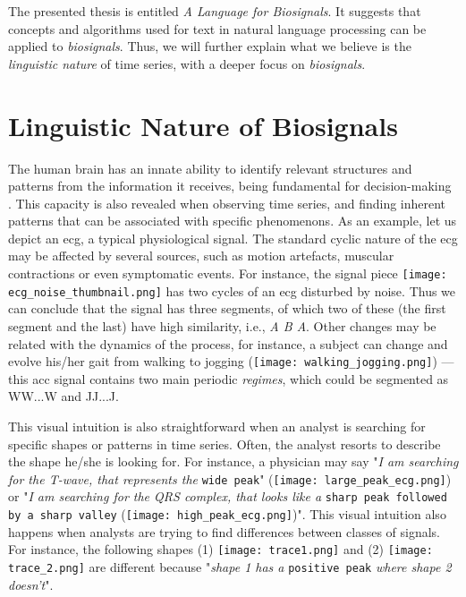 The presented thesis is entitled \textit{A Language for Biosignals}. It suggests that concepts and algorithms used for text in natural language processing can be applied to \textit{biosignals}. Thus, we will further explain what we believe is the \textit{linguistic nature} of time series, with a deeper focus on \textit{biosignals}.  

\section{Linguistic Nature of Biosignals} 
\label{sub:context1}

The human brain has an innate ability to identify relevant structures and patterns from the information it receives, being fundamental for decision-making \cite{cognition}. This capacity is also revealed when observing time series, and finding inherent patterns that can be associated with specific phenomenons. 
As an example, let us depict an \gls{ecg}, a typical physiological signal. The standard cyclic nature of the \gls{ecg} may be affected by several sources, such as motion artefacts, muscular contractions or even symptomatic events.
For instance, the signal piece \texttt{[image: ecg\_noise\_thumbnail.png]} has two cycles of an \textcolor{myblue}{\gls{ecg}} disturbed by \textcolor{myred}{noise}. Thus we can conclude that the signal has three segments, of which two of these (the first segment and the last) have high similarity, i.e., \textit{\textcolor{myblue}{A} \textcolor{myred}{B} \textcolor{myblue}{A}}. Other changes may be related with the dynamics of the process, for instance, a subject can change and evolve his/her gait from \textcolor{myblue}{walking} to \textcolor{mygreen}{jogging} (\texttt{[image: walking\_jogging.png]}) — this \gls{acc} signal contains two main periodic \textit{regimes}, which could be segmented as \textcolor{myblue}{WW...W} and \textcolor{mygreen}{JJ...J}.

This visual intuition is also straightforward when an analyst is searching for specific shapes or patterns in time series. Often, the analyst resorts to describe the shape he/she is looking for. For instance, a physician may say "\textit{I am searching for the T-wave, that represents the} \texttt{wide peak}" (\texttt{[image: large\_peak\_ecg.png]}) or "\textit{I am searching for the QRS complex, that looks like a} \texttt{sharp peak followed by a sharp valley} (\texttt{[image: high\_peak\_ecg.png]})". This visual intuition also happens when analysts are trying to find differences between classes of signals. For instance, the following shapes (1) \texttt{[image: trace1.png]} and (2) \texttt{[image: trace\_2.png]} are different because "\textit{shape 1 has a} \texttt{positive peak} \textit{where shape 2 doesn't}". 

